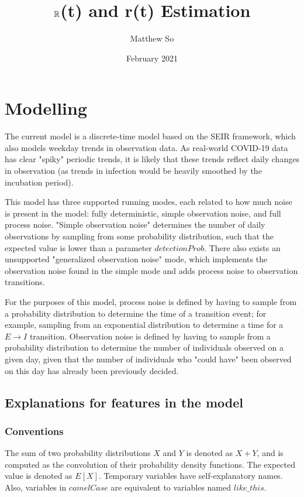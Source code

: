 \documentclass{article}
\title{$\mathbb{R}$(t) and r(t) Estimation}
\author{Matthew So}
\date{February 2021}
\begin{document}
\maketitle



\tableofcontents

\section{Modelling}
The current model is a discrete-time model based on the SEIR framework, which also models weekday trends in observation data. As real-world COVID-19 data has clear "spiky" periodic trends, it is likely that these trends reflect daily changes in observation (as trends in infection would be heavily smoothed by the incubation period). 

This model has three supported running modes, each related to how much noise is present in the model: fully deterministic, simple observation noise, and full process noise. "Simple observation noise" determines the number of daily observations by sampling from some probability distribution, such that the expected value is lower than a parameter $detectionProb$. There also exists an unsupported "generalized observation noise" mode, which implements the observation noise found in the simple mode and adds process noise to observation transitions.

For the purposes of this model, process noise is defined by having to sample from a probability distribution to determine the time of a transition event; for example, sampling from an exponential distribution to determine a time for a $E \rightarrow I$ transition. Observation noise is defined by having to sample from a probability distribution to determine the number of individuals observed on a given day, given that the number of individuals who "could have" been observed on this day has already been previously decided.

\subsection{Explanations for features in the model}

\subsubsection{Conventions}
The sum of two probability distributions $X$ and $Y$ is denoted as $X+Y$, and is computed as the convolution of their probability density functions. The expected value is denoted as $E[X]$. Temporary variables have self-explanatory names. Also, variables in $camelCase$ are equivalent to variables named $like\_this$. 
\end{document}

